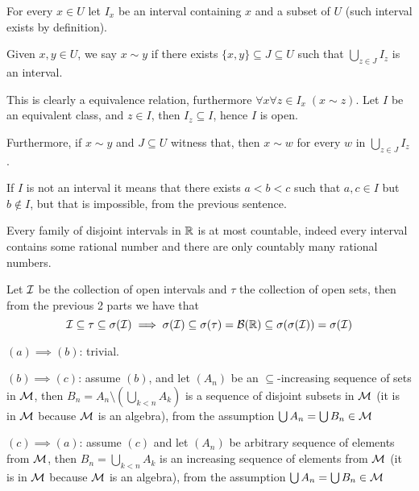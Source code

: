 \begin{cExercise}
	\begin{cPart}
		For every $x\in U$ let $I_x$ be an interval containing $x$ and a subset of $U$ (such interval exists by definition).
		
		Given $x,y\in U$, we say $x\sim y$ if there exists $\{x,y\}\subseteq J\subseteq U$ such that $\bigcup_{z\in J} I_z$ is an interval.
		
		This is clearly a equivalence relation, furthermore $\forall x\forall z\in I_x\;(x\sim z)$. Let $I$ be an equivalent class, and $z\in I$, then $I_z\subseteq I$, hence $I$ is open.
		
		Furthermore, if $x\sim y$ and $J\subseteq U$ witness that, then $x\sim w$ for every $w$ in $\bigcup_{z\in J} I_z$.
		
		If $I$ is not an interval it means that there exists $a<b<c$ such that $a,c\in I$ but $b\notin I$, but that is impossible, from the previous sentence.
	\end{cPart}
	\begin{cPart}
		Every family of disjoint intervals in $\R$ is at most countable, indeed every interval contains some rational number and there are only countably many rational numbers.
	\end{cPart}
	\begin{cPart}
		Let $\cal I$ be the collection of open intervals and $\tau$ the collection of open sets, then from the previous 2 parts we have that 
		$$\cal I\subseteq\tau\subseteq \sigma(\cal I)\implies \sigma(\cal I)\subseteq\sigma(\tau)=\cal B(\R)\subseteq \sigma(\sigma(\cal I))=\sigma(\cal I)$$
	\end{cPart}
\end{cExercise}
\begin{cExercise}
	$(a)\implies (b)$: trivial.
	
	$(b)\implies (c)$: assume $(b)$, and let $(A_n)$ be an $\subseteq$-increasing sequence of sets in $\cal M$, then $B_n=A_n\setminus(\bigcup_{k<n}A_k)$ is a sequence of disjoint subsets in $\cal M$ (it is in $\cal M$ because $\cal M$ is an algebra), from the assumption $\bigcup A_n=\bigcup B_n\in \cal M$
	
	$(c)\implies (a)$: assume $(c)$ and let $(A_n)$ be arbitrary sequence of elements from $\cal M$, then $B_n=\bigcup_{k<n}A_k$ is an increasing sequence of elements from $\cal M$ (it is in $\cal M$ because $\cal M$ is an algebra), from the assumption $\bigcup A_n=\bigcup B_n\in \cal M$
	
\end{cExercise}
